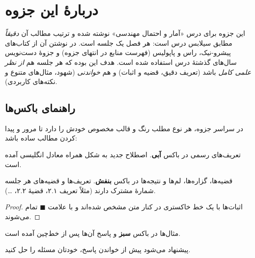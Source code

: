 \chapter*{دربارهٔ این جزوه}

این جزوه برای درس «آمار و احتمال مهندسی» نوشته شده و ترتیب مطالب آن \emph{دقیقاً} مطابق سیلابس درس است: هر فصل یک جلسه است. در نوشتن آن از کتاب‌های پیشرو-نیک، راس و پاپولیس (فهرست منابع در انتهای جزوه) و جزوهٔ دست‌نویس سال‌های گذشتهٔ درس استفاده شده است. هدف این بوده که هر جلسه هم \emph{از نظر علمی کامل} باشد (تعریف دقیق، قضیه و اثبات) و هم \emph{خواندنی} (شهود، مثال‌های متنوع و نکته‌های کاربردی).

\section*{راهنمای باکس‌ها}

در سراسر جزوه، هر نوع مطلب رنگ و قالب مخصوص خودش را دارد تا مرور و پیدا کردن مطالب ساده باشد:

\begin{definition}[title={تعریف \textbar\ نمونه}]{}
تعریف‌های رسمی در باکس \textbf{آبی}. اصطلاح جدید به شکل  همراه معادل انگلیسی آمده است.
\end{definition}

\begin{theorem}[title={قضیه \textbar\ نمونه}]{}
قضیه‌ها، گزاره‌ها، لم‌ها و نتیجه‌ها در باکس \textbf{بنفش}. تعریف‌ها و قضیه‌های هر جلسه شمارهٔ مشترک دارند (مثلاً تعریف ۲.۱، قضیهٔ ۲.۲، \dots).
\end{theorem}

\begin{proof}
اثبات‌ها با یک خط خاکستری در کنار متن مشخص شده‌اند و با علامت $\blacksquare$ تمام می‌شوند.
\end{proof}

\begin{example}[before upper={\leavevmode{\semifont\color{excolor}مثال \textbar\ نمونه}\quad}]{}
مثال‌ها در باکس \textbf{سبز} و پاسخ آن‌ها پس از خط‌چین آمده است.
\begin{solution}
پیشنهاد می‌شود پیش از خواندن پاسخ، خودتان مسئله را حل کنید.
\end{solution}
\end{example}

